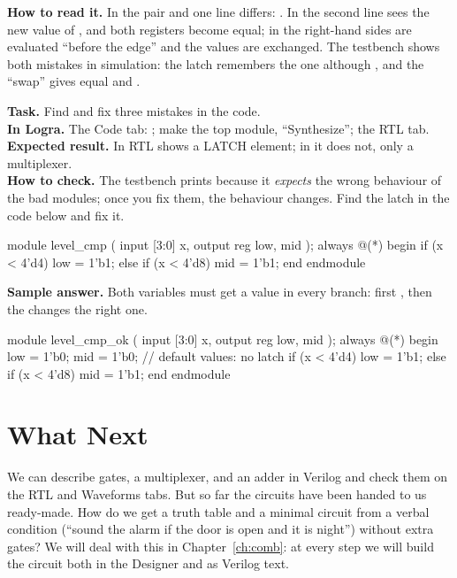
\textbf{How to read it.} In the pair  and  one
line differs: . In  the second line sees the
new value of , and both registers become equal; in  the
right-hand sides are evaluated ``before the edge'' and the values are
exchanged. The testbench  shows both mistakes in
simulation: the latch remembers the one although , and the
``swap'' gives equal  and .

\begin{diybox}
\textbf{Task.} Find and fix three mistakes in the code.\\
\textbf{In Logra.} The Code tab: ; make  the
top module, ``Synthesize''; the RTL tab.\\
\textbf{Expected result.} In  RTL shows a LATCH element; in
 it does not, only a multiplexer.\\
\textbf{How to check.} The testbench  prints
 because it \emph{expects} the wrong behaviour of the bad
modules; once you fix them, the behaviour changes.  Find the latch in
the code below and fix it.
\end{diybox}

\begin{vcode}
module level_cmp (
    input      [3:0] x,
    output reg       low, mid
);
    always @(*) begin
        if (x < 4'd4)       low = 1'b1;
        else if (x < 4'd8)  mid = 1'b1;
    end
endmodule
\end{vcode}
\textbf{Sample answer.} Both variables must get a value in every branch: first
, then the  changes the right one.
\begin{vcode}
module level_cmp_ok (
    input      [3:0] x,
    output reg       low, mid
);
    always @(*) begin
        low = 1'b0;
        mid = 1'b0;                  // default values: no latch
        if (x < 4'd4)       low = 1'b1;
        else if (x < 4'd8)  mid = 1'b1;
    end
endmodule
\end{vcode}


\section{What Next}

We can describe gates, a multiplexer, and an adder in Verilog and check them on
the RTL and Waveforms tabs. But so far the circuits have been handed to us
ready-made. How do we get a truth table and a minimal circuit from a verbal
condition (``sound the alarm if the door is open and it is night'') without
extra gates? We will deal with this in Chapter~\ref{ch:comb}: at every step we
will build the circuit both in the Designer and as Verilog text.
